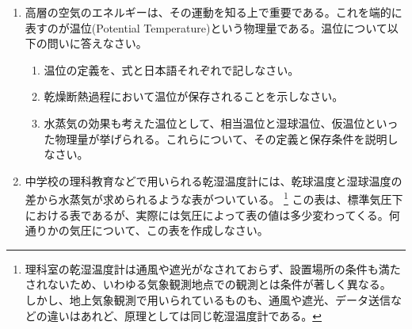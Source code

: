 \documentclass{jsarticle}
\newenvironment{problems}
{
  \renewcommand\labelenumi{\doublebox{\arabic{enumi}}}
  \begin{enumerate}
}{
  \end{enumerate}
  \renewcommand\labelenumi{\arabic{enumi}.}
}
\begin{document}
\begin{problems}
        \begin{enumerate}[(1)]
        \item 文中の空欄(A)〜(J)に当てはまる語句や数値を答えなさい。
        \item 下線部(a)について、理想気体の状態方程式から、(A)の状態方程式を導出しなさい。
        \item 下線部(b)について、気柱の釣り合いから(B)を導出しなさい。
        \item (A),(B)を用い、等温大気における気圧$p$の高度$z$を求めなさい。
        \item 高度$z$で観測した気圧が$p$、気温が$T$であった。この時、この観測地点の$T$を海面補正した値を求めなさい。
        \item 高層天気図で用いられる気圧面(指定気圧面)の代表的な気圧は、300hPa,500hPa,700hPa,850hPaである。これらの気圧面が概ねどの程度の高度に対応するか答えなさい。
        \item 下線部(c)について、(H)を求めるには、通常どのような式を用いるか、2例程度、名前と式を挙げなさい。\\
        \end{enumerate}

    \item 高層の空気のエネルギーは、その運動を知る上で重要である。これを端的に表すのが温位(Potential Temperature)という物理量である。温位について以下の問いに答えなさい。
        \begin{enumerate}[(1)]
        \item 温位の定義を、式と日本語それぞれで記しなさい。
        \item 乾燥断熱過程において温位が保存されることを示しなさい。
        \item 水蒸気の効果も考えた温位として、相当温位と湿球温位、仮温位といった物理量が挙げられる。これらについて、その定義と保存条件を説明しなさい。\\
        \end{enumerate}

    \item 中学校の理科教育などで用いられる乾湿温度計には、乾球温度と湿球温度の差から水蒸気が求められるような表がついている。
        \footnote{理科室の乾湿温度計は通風や遮光がなされておらず、設置場所の条件も満たされないため、いわゆる気象観測地点での観測とは条件が著しく異なる。
                しかし、地上気象観測で用いられているものも、通風や遮光、データ送信などの違いはあれど、原理としては同じ乾湿温度計である。}
        この表は、標準気圧下における表であるが、実際には気圧によって表の値は多少変わってくる。何通りかの気圧について、この表を作成しなさい。\\
\end{problems}
\end{document}
